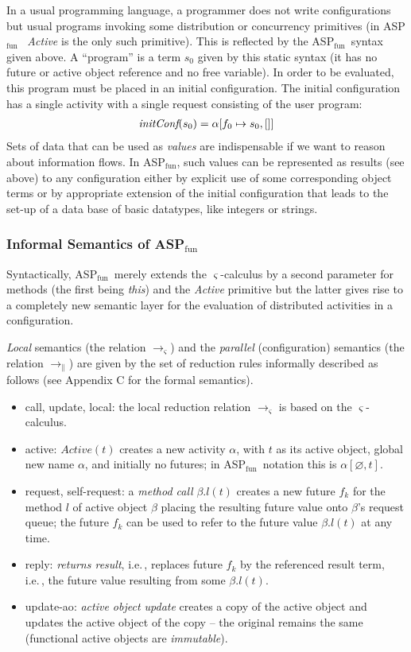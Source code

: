 \documentclass[10pt, conference, compsocconf]{IEEEtran}
\newcommand\aspfun{ASP${}_\text{fun}$\ }
\newcommand\aspfunp{ASP${}_\text{fun}$}
\newcommand{\symb}[1]{\makebox{\it #1}}
\newcommand\loc{\ensuremath{\to_\varsigma}}
\newcommand\dist{\ensuremath{\to_\|}}
\newcommand\ie{i.e.\!\,, }
\begin{document}
{In a usual programming
language, a programmer does not write configurations but usual programs
invoking some distribution or concurrency primitives (in \aspfun
\emph{Active} is the only such primitive). This is reflected by the \aspfun syntax given 
above. A ``program'' is a term $s_0$ given by this static
syntax (it has no future or active object reference and no free variable). In order to be
evaluated, this program must be placed in an initial
configuration. The initial configuration has a single activity with a single request consisting of the user program:
\[
\begin{array}{l}
  \symb{initConf}(s_0) = \alpha[f_0\mapsto s_0,[]]
\end{array}
\]
Sets of data that can be used as {\it values} are indispensable if we want to 
reason about information flows. In \aspfunp, such values can be represented as 
results (see above) to any configuration either by explicit use of some corresponding
object terms or by appropriate extension of the initial configuration that leads to
the set-up of a data base of basic datatypes, like integers or strings. 

\subsubsection{Informal Semantics of \aspfunp}
Syntactically, \aspfun merely extends the $\varsigma$-calculus by a second parameter for methods
(the first being {\it this})
and the \emph{Active} primitive but the latter gives rise to a completely new semantic layer for
the evaluation of distributed activities in a configuration.

{\it Local} semantics (the relation $\loc$) and the 
{\it parallel} (configuration) semantics (the relation $\dist$)
are given by the set of reduction rules informally described as follows (see Appendix C for the formal semantics). \begin{itemize}
\item {\sc call, update, local}: the local reduction relation {$\loc$} is based on the $\varsigma$-calculus.
\item {\sc active}: {$Active(t)$} creates a new activity {$\alpha$}, 
  with {$t$} as its active object, global new name {$\alpha$}, and initially no futures; in \aspfun notation this is {$\alpha[\varnothing, t]$}.
\item {\sc request, self-request}: a {\it method call} {$\beta.l(t)$} creates a new future
  {$f_k$} for the method $l$ of active object {$\beta$} placing the resulting future value
  onto $\beta$'s request queue; the future $f_k$ can be used to refer to the future value 
  $\beta.l(t)$ at any time.
\item {\sc reply}: {\it returns result}, \ie replaces future {$f_k$} by the
      referenced result term, \ie the future value resulting from some $\beta.l(t)$.
\item {\sc update-ao}: {\it active object update} creates a copy of the active object
      and updates the active object of the copy -- the original remains the same (functional active objects are {\it immutable}).
\end{itemize}
}
\end{document}
